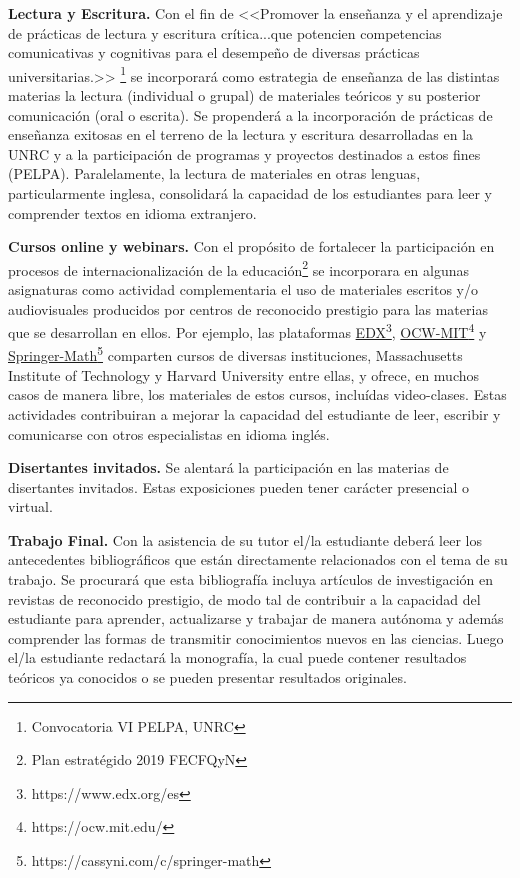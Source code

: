 \documentclass[a4paper, 12pt]{article}
\begin{document}
\begin{description}
 
 




\item{\textbf{Lectura y Escritura.}} Con el fin de <<Promover la enseñanza y el aprendizaje de prácticas de lectura y escritura crítica...que potencien competencias comunicativas y cognitivas para el desempeño de diversas prácticas universitarias.>> \footnote{Convocatoria VI PELPA, UNRC}  se incorporará  como estrategia de enseñanza de las distintas  materias la lectura (individual o grupal) de materiales teóricos y su posterior comunicación (oral o escrita). Se propenderá a la incorporación  de prácticas de enseñanza exitosas en el terreno de la lectura y escritura desarrolladas en la UNRC \cite{roldan2022} y a la participación de programas y proyectos destinados a estos fines (PELPA).  Paralelamente, la lectura de materiales en otras lenguas, particularmente inglesa, consolidará la capacidad de los estudiantes para leer y comprender textos en idioma extranjero.  


\item{\textbf{Cursos online y webinars.}} Con el propósito de fortalecer  la participación en procesos de internacionalización de la educación\footnote{Plan estratégido 2019 FECFQyN}  se  incorporara en algunas asignaturas como actividad complementaria el uso de materiales escritos y/o audiovisuales producidos por centros de reconocido prestigio para las materias que se desarrollan en ellos. Por ejemplo, las plataformas \href{https://www.edx.org/es}{EDX}\footnote{https://www.edx.org/es}, \href{https://ocw.mit.edu/}{OCW-MIT}\footnote{https://ocw.mit.edu/} y  \href{https://cassyni.com/c/springer-math}{Springer-Math}\footnote{https://cassyni.com/c/springer-math} comparten cursos de diversas instituciones, Massachusetts Institute of Technology y Harvard University entre ellas, y ofrece, en muchos casos de manera libre, los materiales de estos cursos, incluídas video-clases. Estas actividades contribuiran a mejorar la capacidad del estudiante de leer, escribir y comunicarse con
otros especialistas en idioma inglés. 


\item{\textbf{Disertantes invitados.}} Se alentará la participación en las materias de disertantes invitados. Estas exposiciones pueden tener carácter presencial o virtual.   

\item{\textbf{Trabajo Final.}}   Con la asistencia de su tutor el/la estudiante deberá leer los antecedentes bibliográficos que están directamente relacionados con el tema de su trabajo. Se procurará que esta bibliografía incluya artículos de investigación en revistas de reconocido prestigio, de modo tal de contribuir a la capacidad del estudiante para aprender, actualizarse y trabajar de manera autónoma y además  comprender las formas de transmitir conocimientos nuevos en las ciencias. Luego el/la estudiante  redactará la monografía, la cual puede contener resultados teóricos ya conocidos o se pueden presentar resultados originales.



\end{description}
\end{document}
